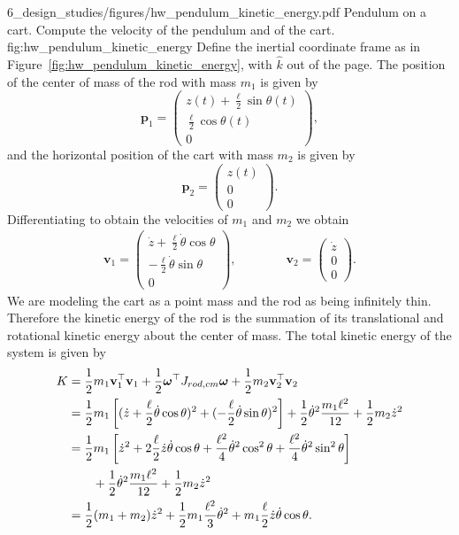 	{6_design_studies/figures/hw_pendulum_kinetic_energy.pdf} 
	{Pendulum on a cart.  Compute the velocity of the pendulum and of the cart.}
	{fig:hw_pendulum_kinetic_energy}
Define the inertial coordinate frame as in Figure~\ref{fig:hw_pendulum_kinetic_energy}, with $\hat{k}$ out of the page.  
The position of the center of mass of the rod with mass $m_1$ is given by
\[
\mathbf{p}_1 = \begin{pmatrix}  z(t) + \frac{\ell}{2} \sin\theta(t) \\ \frac{\ell}{2} \cos\theta(t) \\ 0 \end{pmatrix},
\]
and the horizontal position of the cart with mass $m_2$ is given by 
\[
\mathbf{p}_2 = \begin{pmatrix} z(t) \\ 0 \\ 0 \end{pmatrix}.
\]
Differentiating to obtain the velocities of $m_1$ and $m_2$ we obtain
\begin{align*}
\mathbf{v}_1 = \begin{pmatrix}  \dot{z} + \frac{\ell}{2}\dot{\theta}\cos\theta \\ -\frac{\ell}{2}\dot{\theta}\sin\theta \\ 0 \end{pmatrix}, \qquad\qquad
\mathbf{v}_2 = \begin{pmatrix}  \dot{z} \\ 0 \\ 0 \end{pmatrix}.
\end{align*}
We are modeling the cart as a point mass and the rod as being infinitely thin.  Therefore the kinetic energy of the rod is the summation of its translational and rotational kinetic energy about the center of mass.  The total kinetic energy of the system is given by
\begin{align}
K &= \frac{1}{2} m_1 \mathbf{v}_1^\top \mathbf{v}_1 + \frac{1}{2} \boldsymbol{\omega}^\top J_{rod,cm} \boldsymbol{\omega} + \frac{1}{2}m_2\mathbf{v}_2^\top \mathbf{v}_2 \notag\\
  &= \frac{1}{2} m_1 \left[ (\dot{z} + \frac{\ell}{2}\dot{\theta}\cos\theta)^2 + (-\frac{\ell}{2}\dot{\theta}\sin\theta)^2 \right] +  \frac{1}{2}\dot{\theta}^2 \frac{m_1 \ell^2}{12} +  \frac{1}{2}m_2\dot{z}^2 \notag\\
  &= \frac{1}{2} m_1 \left[ \dot{z}^2 + 2\frac{\ell}{2}\dot{z}\dot{\theta}\cos\theta + \frac{\ell^2}{4}\dot{\theta}^2\cos^2\theta + \frac{\ell^2}{4}\dot{\theta}^2\sin^2\theta \right] \notag
  	\\&\qquad
  	 +  \frac{1}{2}\dot{\theta}^2 \frac{m_1 \ell^2}{12} + \frac{1}{2}m_2\dot{z}^2 \notag\\
  &= \frac{1}{2}(m_1+m_2)\dot{z}^2 + \frac{1}{2}m_1\frac{\ell^2}{3}\dot{\theta}^2 + m_1\frac{\ell}{2}\dot{z}\dot{\theta}\cos\theta.
  \label{eq:pendulum_kinetic_energy}
\end{align}

